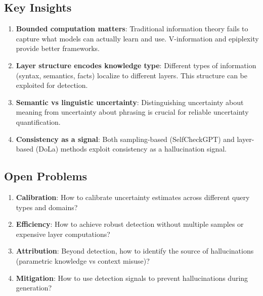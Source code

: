 \documentclass[11pt]{article}
\begin{document}
\subsection{Key Insights}

\begin{enumerate}
    \item \textbf{Bounded computation matters}: Traditional information theory fails to capture what models can actually learn and use. V-information and epiplexity provide better frameworks.

    \item \textbf{Layer structure encodes knowledge type}: Different types of information (syntax, semantics, facts) localize to different layers. This structure can be exploited for detection.

    \item \textbf{Semantic vs linguistic uncertainty}: Distinguishing uncertainty about meaning from uncertainty about phrasing is crucial for reliable uncertainty quantification.

    \item \textbf{Consistency as a signal}: Both sampling-based (SelfCheckGPT) and layer-based (DoLa) methods exploit consistency as a hallucination signal.
\end{enumerate}

\subsection{Open Problems}

\begin{enumerate}
    \item \textbf{Calibration}: How to calibrate uncertainty estimates across different query types and domains?

    \item \textbf{Efficiency}: How to achieve robust detection without multiple samples or expensive layer computations?

    \item \textbf{Attribution}: Beyond detection, how to identify the source of hallucinations (parametric knowledge vs context misuse)?

    \item \textbf{Mitigation}: How to use detection signals to prevent hallucinations during generation?
\end{enumerate}

\end{document}
